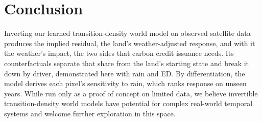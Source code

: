\documentclass[letterpaper]{article} %
\begin{document}
\section{Conclusion}
Inverting our learned transition-density world model on observed satellite data produces the implied residual, the land's weather-adjusted response, and with it the weather's impact, the two sides that carbon credit issuance needs. Its counterfactuals separate that share from the land's starting state and break it down by driver, demonstrated here with rain and ED. By differentiation, the model derives each pixel's sensitivity to rain, which ranks response on unseen years. While run only as a proof of concept on limited data, we believe invertible transition-density world models have potential for complex real-world temporal systems and welcome further exploration in this space.


\end{document}
